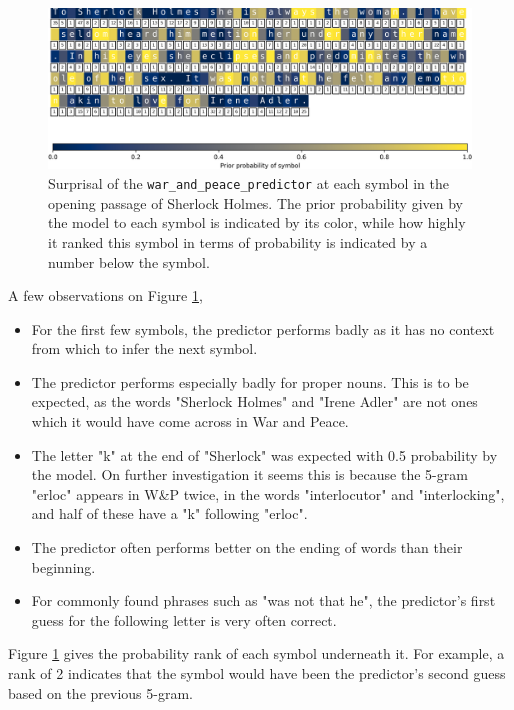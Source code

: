 \begin{figure}[h!]
\centering
\includegraphics[width=\textwidth]{img/predictor_surprisal_by_char.png}
\caption{Surprisal of the \texttt{war\_and\_peace\_predictor} at each symbol in the opening passage of Sherlock Holmes. The prior probability given by the model to each symbol is indicated by its color, while how highly it ranked this symbol in terms of probability is indicated by a number below the symbol.}
\label{fig:predictor_surprisal_by_char}
\end{figure}

A few observations on Figure \ref{fig:predictor_surprisal_by_char},

\begin{itemize}
    \item For the first few symbols, the predictor performs badly as it has no context from which to infer the next symbol.
    \item The predictor performs especially badly for proper nouns. This is to be expected, as the words "Sherlock Holmes" and "Irene Adler" are not ones which it would have come across in War and Peace.
    \item The letter "k" at the end of "Sherlock" was expected with 0.5 probability by the model. On further investigation it seems this is because the 5-gram "erloc" appears in W\&P twice, in the words "interlocutor" and "interlocking", and half of these have a "k" following "erloc".
    \item The predictor often performs better on the ending of words than their beginning.
    \item For commonly found phrases such as "was not that he", the predictor's first guess for the following letter is very often correct.
\end{itemize}

Figure \ref{fig:predictor_surprisal_by_char} gives the probability rank of each symbol underneath it. For example, a rank of 2 indicates that the symbol would have been the predictor's second guess based on the previous 5-gram.

